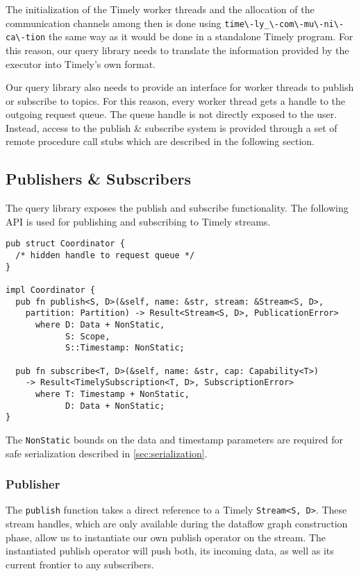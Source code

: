 The initialization of the Timely worker threads and the allocation of the
communication channels among then is done using \lstinline{time\-ly_\-com\-mu\-ni\-ca\-tion}
the same way as it would be done in a standalone Timely program. For this
reason, our query library needs to translate the information provided by the
executor into Timely's own format.

Our query library also needs to provide an interface for worker threads to
publish or subscribe to topics. For this reason, every worker thread gets
a handle to the outgoing request queue. The queue handle is not directly exposed
to the user. Instead, access to the publish \& subscribe system is provided
through a set of remote procedure call stubs which are described in the
following section.

\subsection{Publishers \& Subscribers}

The query library exposes the publish and subscribe functionality. The following
API is used for publishing and subscribing to Timely streams.

\begin{lstlisting}[caption={[Publish \& subscribe interface]
The interface for publishing and subscribing Timely streams.
}]
pub struct Coordinator {
  /* hidden handle to request queue */
}

impl Coordinator {
  pub fn publish<S, D>(&self, name: &str, stream: &Stream<S, D>,
    partition: Partition) -> Result<Stream<S, D>, PublicationError>
      where D: Data + NonStatic, 
            S: Scope,
            S::Timestamp: NonStatic;

  pub fn subscribe<T, D>(&self, name: &str, cap: Capability<T>) 
    -> Result<TimelySubscription<T, D>, SubscriptionError>
      where T: Timestamp + NonStatic, 
            D: Data + NonStatic;
}
\end{lstlisting}

The \lstinline{NonStatic} bounds on the data and timestamp
parameters are required for safe serialization described in \ref{sec:serialization}.

\subsubsection{Publisher}

The \lstinline{publish} function takes a direct reference to a Timely
\lstinline{Stream<S, D>}. These stream handles, which are only available during
the dataflow graph construction phase, allow us to instantiate our own publish
operator on the stream.  The instantiated publish operator will push both, its
incoming data, as well as its current frontier to any subscribers. 

